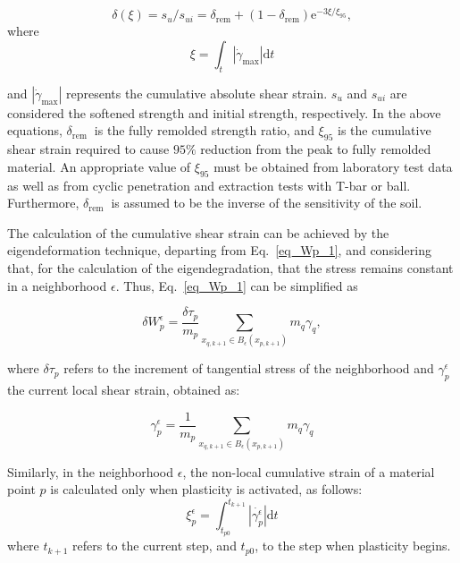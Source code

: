 \documentclass[applsci,journal,article,submit,moreauthors,pdftex]{Definitions/mdpi}
\begin{document}
\begin{equation} \label{eq16}
\delta(\xi)=s_{u} / s_{u i}=\delta_{\mathrm{rem}}+\left(1-\delta_{\mathrm{rem}}\right) \mathrm{e}^{-3 \xi / \xi_{95}},
\end{equation}
where
\begin{equation}\label{eq17}
\xi=\int_{t}\left|\dot{\gamma}_{\max }\right| \mathrm{d} t
\end{equation}

and $\left|\dot{\gamma}_{\max }\right|$ represents the cumulative absolute shear strain. $s_{u}$ and $s_{u i}$ are considered the softened strength and initial strength, respectively. In the above equations, $\delta_{\text {rem }}$ is the fully remolded strength ratio, and $\xi_{95}$ is the cumulative shear strain required to cause $95 \%$ reduction from the peak to fully remolded material.  An appropriate value of $\xi_{95}$ must be obtained from laboratory test data as well as from cyclic penetration and extraction tests with T-bar or ball. Furthermore, $\delta_{\text {rem }}$  is assumed to be the inverse of the sensitivity of the soil.

The calculation of the cumulative shear strain can be achieved by the eigendeformation technique, departing from Eq.~\eqref{eq_Wp_1}, and considering that, for the calculation of the eigendegradation, that the stress remains constant in a neighborhood $\epsilon$. Thus, Eq.~\eqref{eq_Wp_1} can be simplified as

\begin{equation}\label{eq_Wp_4}
\delta W^\epsilon_{p}=\frac{\delta \tau_p} {m_{p}} \sum_{x_{q,k+1}\in B_\epsilon (x_{p,k+1})} m_q \gamma_{q},
\end{equation}

where $\delta \tau_p$ refers to the increment of tangential stress of the neighborhood and $\gamma^{\epsilon}_{p}$ the current local shear strain, obtained as:

\begin{equation}\label{eq_Wp_5}
\gamma^{\epsilon}_{p}=\frac{1}{m_{p}}\sum_{x_{q,k+1}\in B_\epsilon (x_{p,k+1})}m_q \gamma_{q}
\end{equation}

Similarly, in the neighborhood $\epsilon$, the non-local cumulative strain of a material point $p$ is calculated only when plasticity is activated, as follows:
\begin{equation}\label{eq18}
\xi^{\epsilon}_{p}=\int^{t_{k+1}}_{t_{p0}}\left|\dot{\gamma^{\epsilon}_{p}}\right| \mathrm{d} t
\end{equation}
where $t_{k+1}$ refers to the current step, and $t_{p0}$, to the step when plasticity begins. 
\end{document}

